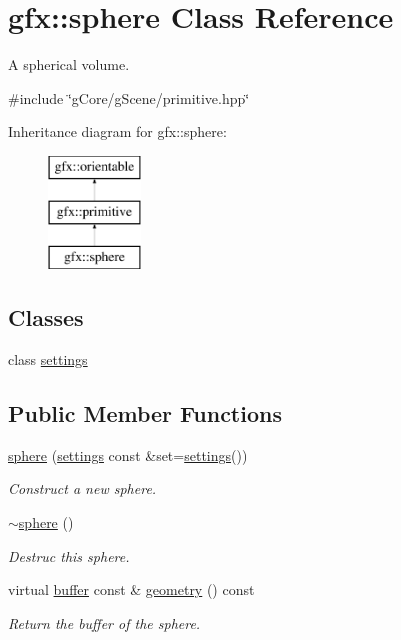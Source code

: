 \hypertarget{classgfx_1_1sphere}{\section{gfx\-:\-:sphere Class Reference}
\label{classgfx_1_1sphere}
}


A spherical volume.  




{\ttfamily \#include \char`\"{}g\-Core/g\-Scene/primitive.\-hpp\char`\"{}}

Inheritance diagram for gfx\-:\-:sphere\-:\begin{figure}[H]
\begin{center}
\leavevmode
\includegraphics[height=3.000000cm]{classgfx_1_1sphere}
\end{center}
\end{figure}
\subsection*{Classes}
\begin{DoxyCompactItemize}
\item 
class \hyperlink{classgfx_1_1sphere_1_1settings}{settings}
\end{DoxyCompactItemize}
\subsection*{Public Member Functions}
\begin{DoxyCompactItemize}
\item 
\hyperlink{classgfx_1_1sphere_a51e1424b4e54decb2255baa300a64cad}{sphere} (\hyperlink{classgfx_1_1sphere_1_1settings}{settings} const \&set=\hyperlink{classgfx_1_1sphere_1_1settings}{settings}())
\begin{DoxyCompactList}\small\item\em Construct a new sphere. \end{DoxyCompactList}\item 
\hypertarget{classgfx_1_1sphere_aedeb866aac2424ac1bb83c40efd6d1b3}{\hyperlink{classgfx_1_1sphere_aedeb866aac2424ac1bb83c40efd6d1b3}{$\sim$sphere} ()}\label{classgfx_1_1sphere_aedeb866aac2424ac1bb83c40efd6d1b3}

\begin{DoxyCompactList}\small\item\em Destruc this sphere. \end{DoxyCompactList}\item 
virtual \hyperlink{classgfx_1_1buffer}{buffer} const \& \hyperlink{classgfx_1_1sphere_a647c390921b28d2f83f86eca9f82eb2f}{geometry} () const 
\begin{DoxyCompactList}\small\item\em Return the buffer of the sphere. \end{DoxyCompactList}\end{DoxyCompactItemize}
